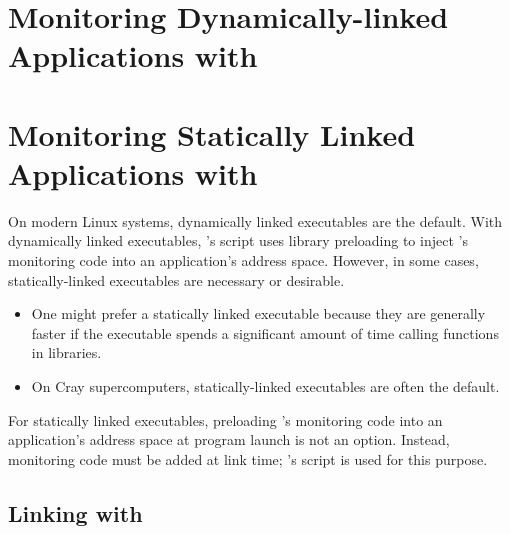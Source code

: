 \documentclass[11pt,twoside,letterpaper]{report}
\begin{document}

\cleardoublepage
\chapter{Monitoring Dynamically-linked Applications with \hpcrun{}}
\label{chpt:hpcrun}




\cleardoublepage

\chapter{Monitoring Statically Linked Applications with \hpclink{}}
\label{chpt:statically-linked-apps}



On modern Linux systems, dynamically linked executables are the default.
With dynamically linked executables, \HPCToolkit{}'s \hpcrun{} script uses library preloading to inject \HPCToolkit's monitoring code into an application's address space.
However, in some cases, statically-linked executables are necessary or desirable.
\begin{itemize}
\item One might prefer a statically linked executable because they are generally faster if the executable spends a significant amount of time calling functions in libraries.
\item On Cray supercomputers, statically-linked executables are often the default.
\end{itemize}

For statically linked executables, preloading \HPCToolkit's monitoring code into an application's address space at program launch is not an option.
Instead, monitoring code must be added at link time; \HPCToolkit{}'s \hpclink{} script is used for this purpose.


\section{Linking with \hpclink{}}
\end{document}
